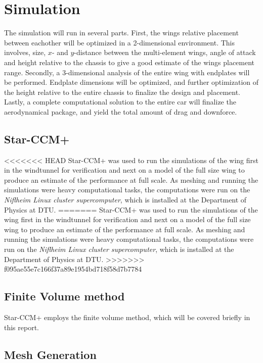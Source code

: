 \chapter{Simulation}

  The simulation will run in several parts. First, the wings relative placement between eachother will be optimized in a 2-dimensional environment. This involves, size, $x$- and $y$-distance between the multi-element wings, angle of attack and height relative to the chassis to give a good estimate of the wings placement range. Secondly, a 3-dimensional analysis of the entire wing with endplates will be performed. Endplate dimensions will be optimized, and further optimization of the height relative to the entire chassis to finalize the design and placement. Lastly, a complete computational solution to the entire car will finalize the aerodynamical package, and yield the total amount of drag and downforce.

\section{Star-CCM+}
<<<<<<< HEAD
  Star-CCM+ was used to run the simulations of the wing first in the windtunnel for
  verification and next on a model of the full size wing
  to produce an estimate of the performance at full scale.
  As meshing and running the simulations were heavy computational tasks, the computations were
  run on the \textit{Niflheim Linux cluster supercomputer}, which is installed at
  the Department of Physics at DTU.
=======
Star-CCM+ was used to run the simulations of the wing first in the windtunnel for verification and next on a model of the full size wing to produce an estimate of the performance at full scale. As meshing and running the simulations were heavy computational tasks, the computations were run on the \textit{Niflheim Linux cluster supercomputer}, which is installed at the Department of Physics at DTU.
>>>>>>> f095ae55e7c166f37a89e1954bd718f58d7b7784


\section{Finite Volume method}

  Star-CCM+ employs the finite volume method, which will be covered briefly in this report.

\section{Mesh Generation}

